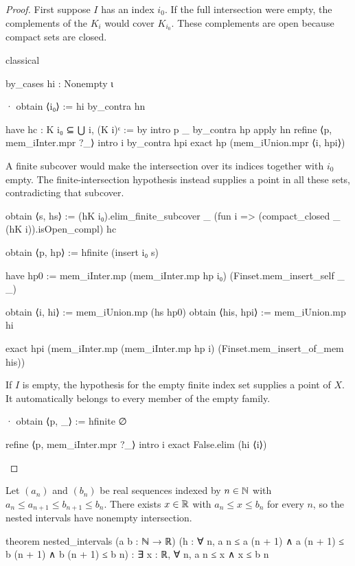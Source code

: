 \begin{proof}
  First suppose $I$ has an index $i_0$.
  If the full intersection were empty, the complements of the $K_i$ would cover $K_{i_0}$.
  These complements are open because compact sets are closed.

  \begin{lean}
    classical

    by_cases hi : Nonempty ι

    · obtain ⟨i₀⟩ := hi
      by_contra hn

      have hc : K i₀ ⊆ ⋃ i, (K i)ᶜ := by
        intro p _
        by_contra hp
        apply hn
        refine ⟨p, mem_iInter.mpr ?_⟩
        intro i
        by_contra hpi
        exact hp (mem_iUnion.mpr ⟨i, hpi⟩)
  \end{lean}

  A finite subcover would make the intersection over its indices together with $i_0$ empty.
  The finite-intersection hypothesis instead supplies a point in all these sets, contradicting that
  subcover.

  \begin{lean}
    obtain ⟨s, hs⟩ := (hK i₀).elim_finite_subcover _
      (fun i => (compact_closed _ (hK i)).isOpen_compl) hc

    obtain ⟨p, hp⟩ := hfinite (insert i₀ s)

    have hp0 := mem_iInter.mp (mem_iInter.mp hp i₀) (Finset.mem_insert_self _ _)

    obtain ⟨i, hi⟩ := mem_iUnion.mp (hs hp0)
    obtain ⟨his, hpi⟩ := mem_iUnion.mp hi

    exact hpi (mem_iInter.mp (mem_iInter.mp hp i) (Finset.mem_insert_of_mem his))
  \end{lean}

  If $I$ is empty, the hypothesis for the empty finite index set supplies a point of $X$.
  It automatically belongs to every member of the empty family.

  \begin{lean}
    · obtain ⟨p, _⟩ := hfinite ∅

      refine ⟨p, mem_iInter.mpr ?_⟩
      intro i
      exact False.elim (hi ⟨i⟩)
  \end{lean}

\end{proof}

\begin{lemma}
  \label{an1:lem:nested-intervals}
  Let $(a_n)$ and $(b_n)$ be real sequences indexed by $n\in\mathbb{N}$ with $a_n\leq a_{n+1}\leq
    b_{n+1}\leq b_n$.
  There exists $x\in\mathbb{R}$ with $a_n\leq x\leq b_n$ for every $n$, so the nested intervals have
  nonempty intersection.

  \begin{lean}
    theorem nested_intervals (a b : ℕ → ℝ)
        (h : ∀ n, a n ≤ a (n + 1) ∧ a (n + 1) ≤ b (n + 1) ∧ b (n + 1) ≤ b n) :
        ∃ x : ℝ, ∀ n, a n ≤ x ∧ x ≤ b n
  \end{lean}
\end{lemma}

